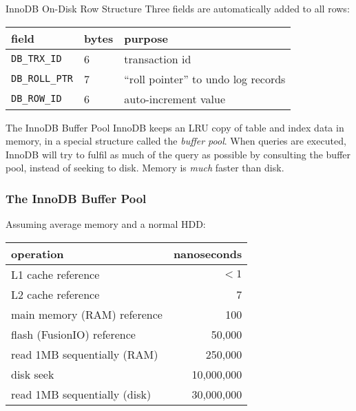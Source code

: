 \documentclass[14pt]{beamer}
\begin{document}
\begin{frame}{InnoDB On-Disk Row Structure}
  Three fields are automatically added to all rows:
  \begin{table}[ht]
    \begin{tabular}{l l l}
      field                  & bytes & purpose \\ \hline
      \texttt{DB\_TRX\_ID}   & 6     & transaction id \\
      \texttt{DB\_ROLL\_PTR} & 7     & ``roll pointer'' to undo log records \\
      \texttt{DB\_ROW\_ID}   & 6     & auto-increment value
    \end{tabular}
  \end{table}
\end{frame}

\begin{frame}{The InnoDB Buffer Pool}
  InnoDB keeps an LRU copy of table and index data in memory, in a special
  structure called the \emph{buffer pool}. When queries are executed, InnoDB
  will try to fulfil as much of the query as possible by consulting the buffer
  pool, instead of seeking to disk.
  \newline
  \newline
  Memory is \emph{much} faster than disk.
\end{frame}

\begin{frame}[fragile]
  \frametitle{The InnoDB Buffer Pool}
  Assuming average memory and a normal HDD:
  \begin{table}[ht]
    \begin{tabular}{l r}
      operation                    & nanoseconds \\ \hline
      L1 cache reference           & $<1$        \\
      L2 cache reference           & 7           \\
      main memory (RAM) reference  & 100         \\
      flash (FusionIO) reference   & 50,000      \\
      read 1MB sequentially (RAM)  & 250,000     \\
      disk seek                    & 10,000,000  \\
      read 1MB sequentially (disk) & 30,000,000  \\
    \end{tabular}
  \end{table}
\end{frame}
\end{document}
